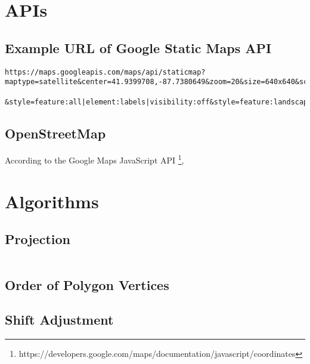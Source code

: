 \chapter{APIs}

\section{Example URL of Google Static Maps API}\label{app:apimap}

\begin{lstlisting}
https://maps.googleapis.com/maps/api/staticmap?maptype=satellite&center=41.9399708,-87.7380649&zoom=20&size=640x640&scale=1&key=???

&style=feature:all|element:labels|visibility:off&style=feature:landscape.man_made|element:geometry.stroke|color:0x00ff00
\end{lstlisting}

\section{OpenStreetMap}\label{app:apiosm}

According to the Google Maps JavaScript API \footnote{https://developers.google.com/maps/documentation/javascript/coordinates},

\chapter{Algorithms}
\section{Projection}\label{app:projec}

\begin{lstlisting}
\end{lstlisting}

\section{Order of Polygon Vertices}\label{app:revpoly}

\section{Shift Adjustment}\label{app:shift}

